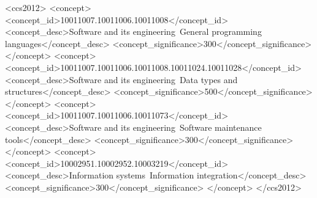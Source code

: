 \documentclass[english,crc]{programming}
\begin{document}
\begin{CCSXML}
<ccs2012>
   <concept>
       <concept_id>10011007.10011006.10011008</concept_id>
       <concept_desc>Software and its engineering~General programming languages</concept_desc>
       <concept_significance>300</concept_significance>
       </concept>
   <concept>
       <concept_id>10011007.10011006.10011008.10011024.10011028</concept_id>
       <concept_desc>Software and its engineering~Data types and structures</concept_desc>
       <concept_significance>500</concept_significance>
       </concept>
   <concept>
       <concept_id>10011007.10011006.10011073</concept_id>
       <concept_desc>Software and its engineering~Software maintenance tools</concept_desc>
       <concept_significance>300</concept_significance>
       </concept>
   <concept>
       <concept_id>10002951.10002952.10003219</concept_id>
       <concept_desc>Information systems~Information integration</concept_desc>
       <concept_significance>300</concept_significance>
       </concept>
 </ccs2012>
\end{CCSXML}


\maketitle
\end{document}
